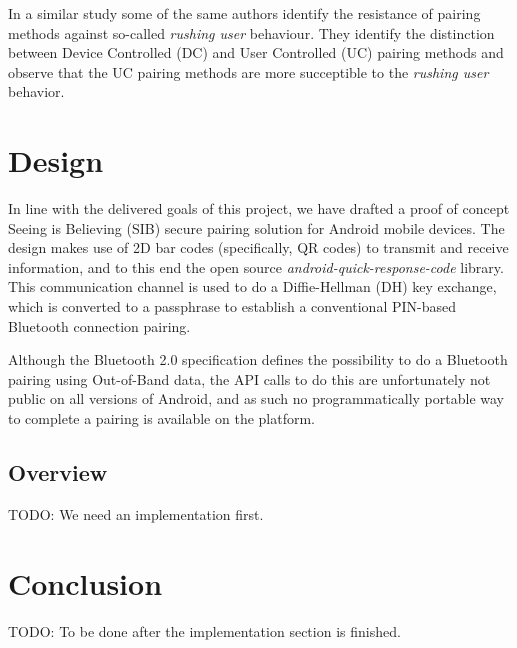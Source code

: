 \documentclass[conference, 11pt]{sty/IEEEtran}
\begin{document}
In a similar study \cite{kobsa2009serial} some of the same authors identify the resistance of pairing methods against so-called \textit{rushing user} behaviour.
They identify the distinction between Device Controlled (DC) and User Controlled (UC) pairing methods and observe that the UC pairing methods are more succeptible to the \textit{rushing user} behavior.

\section{Design}
\label{sec:design}
In line with the delivered goals of this project, we have drafted a proof of concept Seeing is Believing (SIB) secure pairing solution for Android mobile devices.
The design makes use of 2D bar codes (specifically, QR codes) to transmit and receive information, and to this end the open source \textit{android-quick-response-code}\cite{aqrc} library.
This communication channel is used to do a Diffie-Hellman (DH) key exchange, which is converted to a passphrase to establish a conventional PIN-based Bluetooth connection pairing.


Although the Bluetooth 2.0 specification defines the possibility to do a Bluetooth pairing using Out-of-Band data, the API calls to do this are unfortunately not public on all versions of Android, and as such no programmatically portable way to complete a pairing is available on the platform.

\subsection{Overview}
\label{ssec:overview}

TODO: We need an implementation first.

\section{Conclusion}
\label{sec:conclusion}

TODO: To be done after the implementation section is finished.



\end{document}
